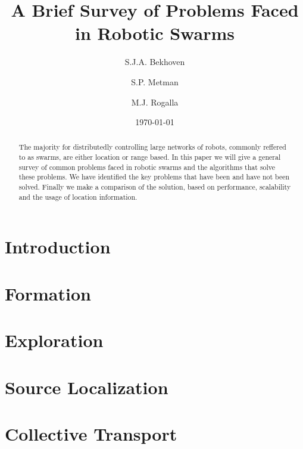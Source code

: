 \documentclass[a4paper]{article}
\title{A Brief Survey of Problems Faced \\ in Robotic Swarms}
\author{S.J.A. Bekhoven  \and
    S.P. Metman \and
    M.J. Rogalla}
\date{\today}
\begin{document}
\maketitle
\thispagestyle{empty}

\begin{abstract}
The majority for distributedly controlling large networks of robots, commonly reffered to as swarms, are either location or range based.
In this paper we will give a general survey of common problems faced in robotic swarms and the algorithms that solve these problems.
We have identified the key problems that have been and have not been solved. Finally we make a comparison of the solution, based on performance, scalability and the usage of location information.
\end{abstract}


\section{Introduction}
  

\section{Formation}
  \label{sec:Formation}
  

\section{Exploration}
  \label{sec:Exploration}
  
 
 
\section{Source Localization}
  \label{sec:Localization}
  

\section{Collective Transport}
  \label{sec:CollectiveTransport}
  
  
\end{document}
